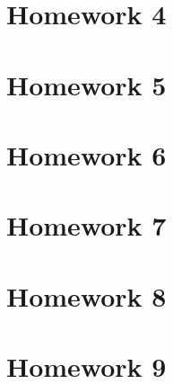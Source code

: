\documentclass[12pt]{article}
\begin{document}
\newpage

\section{Homework 4}



\newpage

\section{Homework 5}



\newpage

\section{Homework 6}


\newpage

\section{Homework 7}



\newpage

\section{Homework 8}




\newpage

\section{Homework 9}


\end{document}
